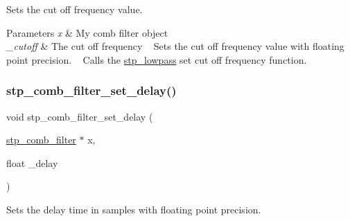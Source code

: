 Sets the cut off frequency value. ~\newline
 


\begin{DoxyParams}{Parameters}
{\em x} & My comb filter object ~\newline
 \\
\hline
{\em \+\_\+cutoff} & The cut off frequency ~\newline
 Sets the cut off frequency value with floating point precision. ~\newline
 Calls the \hyperlink{structstp__lowpass}{stp\+\_\+lowpass} set cut off frequency function. ~\newline
 \\
\hline
\end{DoxyParams}
\mbox{\label{structstp__comb__filter_a85a221fad983cb07992599fb489b6dca}} 
\subsubsection{\texorpdfstring{stp\+\_\+comb\+\_\+filter\+\_\+set\+\_\+delay()}{stp\_comb\_filter\_set\_delay()}}
{\footnotesize\ttfamily void stp\+\_\+comb\+\_\+filter\+\_\+set\+\_\+delay (\begin{DoxyParamCaption}\item[{\hyperlink{structstp__comb__filter}{stp\+\_\+comb\+\_\+filter} $\ast$}]{x,  }\item[{float}]{\+\_\+delay }\end{DoxyParamCaption})\hspace{0.3cm}{\ttfamily [related]}}



Sets the delay time in samples with floating point precision. ~\newline
 


